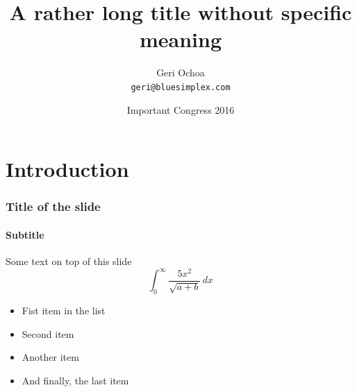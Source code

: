\documentclass{beamer}
\title{A rather long title without specific meaning}
\author{Geri Ochoa\\
\texttt{geri@bluesimplex.com}}
\date{Important Congress 2016}
\institute{Institute of Mathematics, Great University}
\begin{document}
  \begin{frame}
    \titlepage
  \end{frame}

  \section{Introduction}
  \begin{frame}
    \frametitle{Title of the slide}
    \framesubtitle{Subtitle}
    Some text on top of this slide
    \[
    \int_{0}^{\infty} \frac{5x^2}{\sqrt{a+b}}\, dx
    \]
    \begin{itemize}
    \item[\checkmark] Fist item in the list
    \item Second item
    \item Another item
    \item And finally, the last item
  \end{itemize}
  \end{frame}
\end{document}
